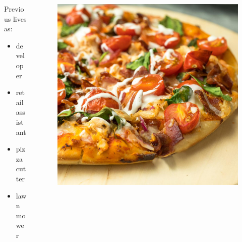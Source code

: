 \documentclass{beamer}
\begin{document}
\begin{frame}
    \begin{columns}
        \begin{column}{0.5\textwidth}
            Previous lives as: 
            \begin{itemize}
                \item developer
                \item retail assistant
                \item pizza cutter
                \item lawn mower
            \end{itemize}
        \end{column}
        \begin{column}{0.5\textwidth}
            \begin{figure}
                \centering
                \includegraphics[width=1\textwidth,keepaspectratio]{../resources/pizza.jpg}
            \end{figure}
        \end{column}
    \end{columns}
\end{frame}
\end{document}
